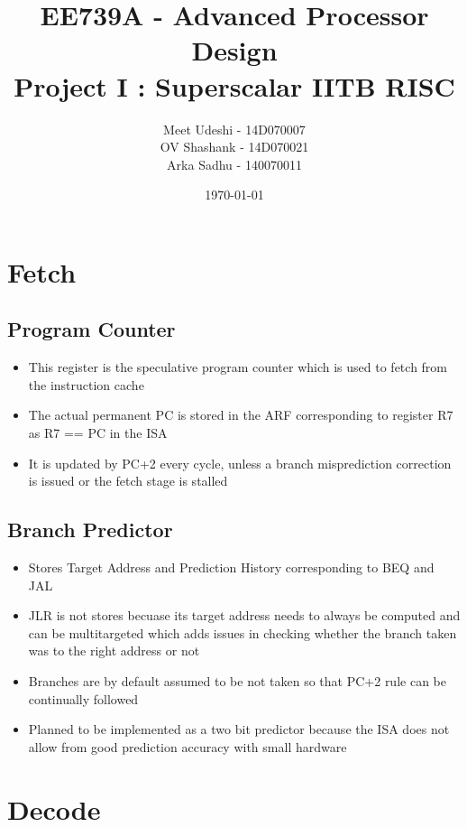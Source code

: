 \documentclass{article}
\title{EE739A - Advanced Processor Design\\
  Project I : Superscalar IITB RISC
}
\author{Meet Udeshi - 14D070007\\
  OV Shashank - 14D070021\\
  Arka Sadhu - 140070011\\
}
\date{\today}
\begin{document}
\maketitle

\section{Fetch}
\subsection{Program Counter}
\begin{itemize}
\item This register is the speculative program counter which is used to fetch from the instruction cache
\item The actual permanent PC is stored in the ARF corresponding to register R7 as R7 == PC in the ISA
\item It is updated by PC+2 every cycle, unless a branch misprediction correction is issued or the fetch stage is stalled
\end{itemize}
\subsection{Branch Predictor}
\begin{itemize}
\item Stores Target Address and Prediction History corresponding to BEQ and JAL
\item JLR is not stores becuase its target address needs to always be computed and can be multitargeted which adds issues in checking whether the branch taken was to the right address or not
\item Branches are by default assumed to be not taken so that PC+2 rule can be continually followed
\item Planned to be implemented as a two bit predictor because the ISA does not allow from good prediction accuracy with small hardware
\end{itemize}

\section{Decode}
\end{document}
